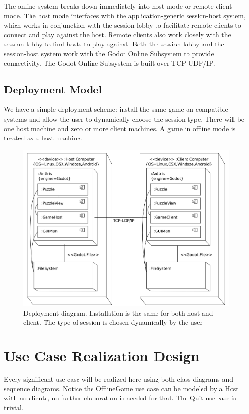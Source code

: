 \documentclass[12pt]{article}
\begin{document}
The online system breaks down immediately into host mode or remote client mode. The host
mode interfaces with the application-generic session-host system, which works in conjunction
with the session lobby to facilitate remote clients to connect and play against the host.
Remote clients also work closely with the session lobby to find hosts to play against. Both
the session lobby and the session-host system work with the Godot Online Subsystem to provide
connectivity. The Godot Online Subsystem is built over TCP-UDP/IP.

\subsection{Deployment Model}
We have a simple deployment scheme: install the same game on compatible systems
and allow the user to dynamically choose the session type. There will be
one host machine and zero or more client machines. A game in offline mode is
treated as a host machine.
    \begin{figure}[H]
        \centering
        \includegraphics[width=6in]{deployment_diagram.png}
        \caption{Deployment diagram. Installation is the same for both host and
        client. The type of session is chosen dynamically by the user}
    \end{figure}

\section{Use Case Realization Design}
Every significant use case will be realized here using both class diagrams and
sequence diagrams. Notice the OfflineGame use case can be modeled by a Host
with no clients, no further elaboration is needed for that. The Quit use case
is trivial.
\end{document}
